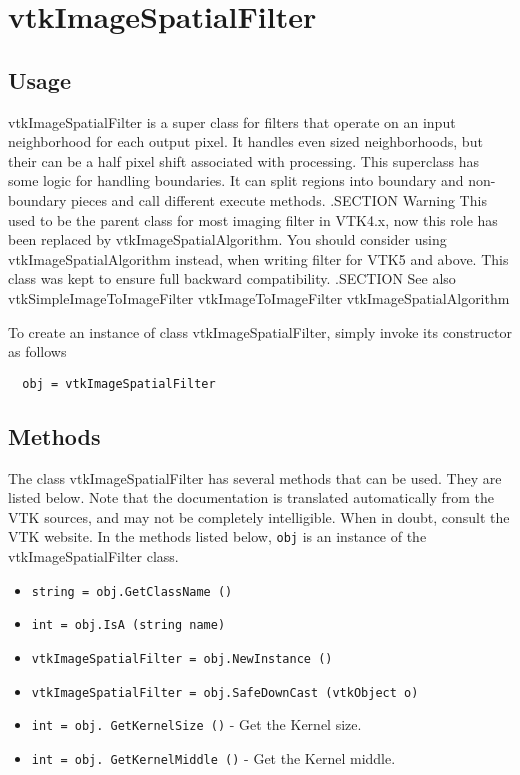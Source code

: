 \section{vtkImageSpatialFilter}

\subsection{Usage}

 vtkImageSpatialFilter is a super class for filters that operate on an
 input neighborhood for each output pixel. It handles even sized
 neighborhoods, but their can be a half pixel shift associated with
 processing.  This superclass has some logic for handling boundaries.  It
 can split regions into boundary and non-boundary pieces and call different
 execute methods.
 .SECTION Warning
 This used to be the parent class for most imaging filter in VTK4.x, now 
 this role has been replaced by vtkImageSpatialAlgorithm. You should consider
 using vtkImageSpatialAlgorithm instead, when writing filter for VTK5 and above.
 This class was kept to ensure full backward compatibility.
 .SECTION See also
 vtkSimpleImageToImageFilter vtkImageToImageFilter vtkImageSpatialAlgorithm 

To create an instance of class vtkImageSpatialFilter, simply
invoke its constructor as follows
\begin{verbatim}
  obj = vtkImageSpatialFilter
\end{verbatim}
\subsection{Methods}

The class vtkImageSpatialFilter has several methods that can be used.
  They are listed below.
Note that the documentation is translated automatically from the VTK sources,
and may not be completely intelligible.  When in doubt, consult the VTK website.
In the methods listed below, \verb|obj| is an instance of the vtkImageSpatialFilter class.
\begin{itemize}
\item  \verb|string = obj.GetClassName ()|

\item  \verb|int = obj.IsA (string name)|

\item  \verb|vtkImageSpatialFilter = obj.NewInstance ()|

\item  \verb|vtkImageSpatialFilter = obj.SafeDownCast (vtkObject o)|

\item  \verb|int = obj. GetKernelSize ()| -  Get the Kernel size.

\item  \verb|int = obj. GetKernelMiddle ()| -  Get the Kernel middle.

\end{itemize}
